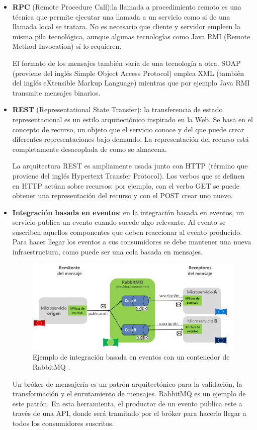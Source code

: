 \documentclass[11pt,spanish,listoffigures]{tfgetsinf}
\begin{document}
\begin{itemize}

\item \textbf{RPC} (Remote Procedure Call):la llamada a procedimiento remoto es una técnica que permite ejecutar una llamada a un servicio como si de una llamada local se tratara. No es necesario que cliente y servidor empleen la misma pila tecnológica, aunque algunas tecnologías como Java RMI (Remote Method Invocation) sí lo requieren. 

El formato de los mensajes también varía de una tecnología a otra. SOAP (proviene del inglés Simple Object Access Protocol) emplea XML (también del inglés eXtensible Markup Language) mientras que por ejemplo Java RMI transmite mensajes binarios.

\item \textbf{REST} (Representational State Transfer): la transferencia de estado representacional es un estilo arquitectónico inspirado en la Web. Se basa en el concepto de recurso, un objeto que el servicio conoce y del que puede crear diferentes representaciones bajo demando. La representación del recurso está completamente desacoplada de como se almacena.

La arquitectura REST es ampliamente usada junto con HTTP (término que proviene del inglés Hypertext Transfer Protocol). Los verbos que se definen en HTTP actúan sobre recursos: por ejemplo, con el verbo GET se puede obtener una representación del recurso y con el POST crear uno nuevo.

\item \textbf{Integración basada en eventos}: en la integración basada en eventos, un servicio publica un evento cuando sucede algo relevante. Al evento se suscriben aquellos componentes que deben reaccionar al evento producido. Para hacer llegar los eventos a sus consumidores se debe mantener una nueva infraestructura, como puede ser una cola basada en mensajes.

\begin{figure}[h]
\centering
\includegraphics[scale=0.85]{rabbitmq}
\caption{Ejemplo de integración basada en eventos con un contenedor de RabbitMQ \cite{DelaTorre2018}.}
\end{figure}

Un bróker de mensajería es un patrón arquitectónico para la validación, la transformación y el enrutamiento de mensajes. RabbitMQ es un ejemplo de este patrón. En esta herramienta, el productor de un evento publica este a través de una API, donde será tramitado por el bróker para hacerlo llegar a todos los consumidores suscritos.
 
\end{itemize}
\end{document}
